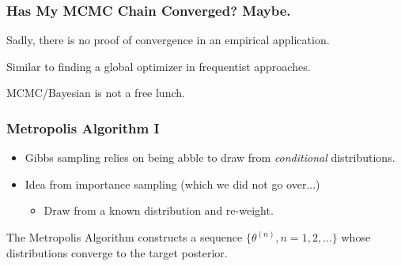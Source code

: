 \documentclass[11pt, aspectratio=169]{beamer}
\newcommand{\Skip}{\vspace{1em}}
\begin{document}
\begin{frame}[c]\frametitle{Has My MCMC Chain Converged? Maybe. }
    
Sadly, there is no proof of convergence in an empirical application. 

\Skip
Similar to finding a global optimizer in frequentist approaches. 


\Skip
MCMC/Bayesian is not a free lunch. 

\end{frame}


\begin{frame}[c]\frametitle{Metropolis Algorithm I}
    
\begin{itemize}
  \item Gibbs sampling relies on being abble to draw from \emph{conditional} distributions.
  \item Idea from importance sampling (which we did not go over...)
  \begin{itemize}
     \item Draw from a known distribution and re-weight. 
   \end{itemize} 
\end{itemize}

\Skip
The Metropolis Algorithm constructs a sequence $\{\theta^{(n)}, n=1,2,... \}$ whose distributions converge to the target posterior. 


\end{frame}
\end{document}
